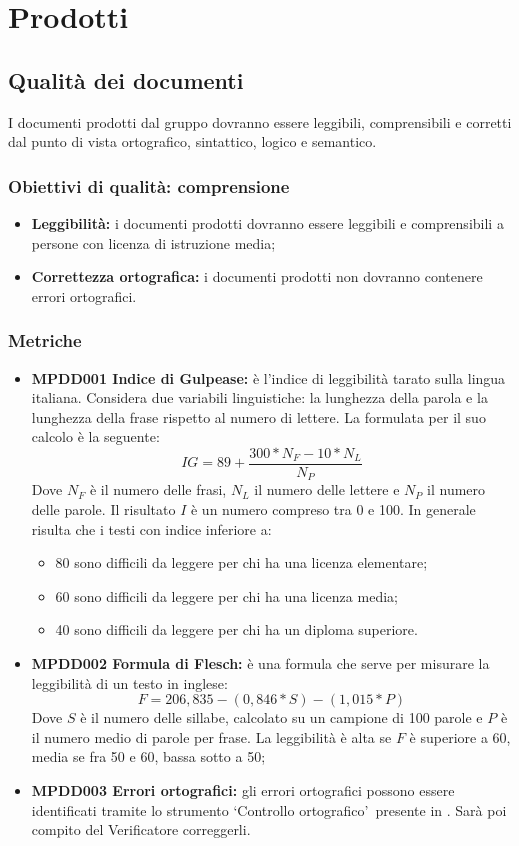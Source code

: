 \documentclass[NormeDiProgetto.tex]{subfiles}
\begin{document}
	\section{Prodotti}
	\subsection{Qualità dei documenti}
	I documenti prodotti dal gruppo \gruppo dovranno essere leggibili, comprensibili e corretti dal punto di vista ortografico, sintattico, logico e semantico.
	\subsubsection{Obiettivi di qualità: comprensione}
	\begin{itemize}
		\item \textbf{Leggibilità:} i documenti prodotti dovranno essere leggibili e comprensibili a persone con licenza di istruzione media;
		\item \textbf{Correttezza ortografica:} i documenti prodotti non dovranno contenere errori ortografici.
	\end{itemize}
	
	\subsubsection{Metriche}
	\begin{itemize}
		\item \textbf{MPDD001 Indice di Gulpease:} è l'indice di leggibilità tarato sulla lingua italiana. Considera due variabili linguistiche: la lunghezza della parola e la lunghezza della frase rispetto al numero di lettere. La formulata per il suo calcolo è la seguente:
		\[IG=89+\dfrac{300*N_F-10*N_L}{N_P}\] Dove $ N_F $ è il numero delle frasi, $ N_L $ il numero delle lettere e $ N_P $ il numero delle parole. Il risultato $I$ è un numero compreso tra 0 e 100. In generale risulta che i testi con indice inferiore a:
		\begin{itemize}
			\item 80 sono difficili da leggere per chi ha una licenza elementare;
			\item 60 sono difficili da leggere per chi ha una licenza media;
			\item 40 sono difficili da leggere per chi ha un diploma superiore.
		\end{itemize}	
		\item \textbf{MPDD002 Formula di Flesch:} è una formula che serve per misurare la leggibilità di un testo in inglese:
		\[F=206,835-(0,846*S)-(1,015*P)\] Dove $ S $ è il numero delle sillabe, calcolato su un campione di 100 parole e $ P $ è il numero medio di parole per frase.
		La leggibilità è alta se $F$ è superiore a 60, media se fra 50 e 60, bassa sotto a 50;
		\item \textbf{MPDD003 Errori ortografici:} gli errori ortografici possono essere identificati tramite lo strumento \textquoteleft Controllo ortografico\textquoteright\ presente in . Sarà poi compito del Verificatore correggerli.  	
	\end{itemize}
	
\end{document}
